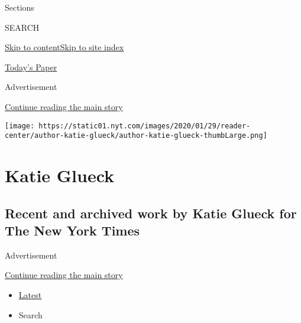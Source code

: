 Sections

SEARCH

\protect\hyperlink{site-content}{Skip to
content}\protect\hyperlink{site-index}{Skip to site index}

\href{https://myaccount.nytimes.com/auth/login?response_type=cookie\&client_id=vi}{}

\href{https://www.nytimes.com/section/todayspaper}{Today's Paper}

Advertisement

\protect\hyperlink{after-top}{Continue reading the main story}

\texttt{[image: https://static01.nyt.com/images/2020/01/29/reader-center/author-katie-glueck/author-katie-glueck-thumbLarge.png]}

\hypertarget{katie-glueck}{%
\section{Katie Glueck}\label{katie-glueck}}

\hypertarget{recent-and-archived-work-by-katie-glueck-for-the-new-york-times}{%
\subsection{Recent and archived work by Katie Glueck for The New York
Times}\label{recent-and-archived-work-by-katie-glueck-for-the-new-york-times}}

Advertisement

\protect\hyperlink{after-mid1}{Continue reading the main story}

\begin{itemize}
\tightlist
\item
  \protect\hyperlink{stream-panel}{Latest}
\item
  Search
\end{itemize}

